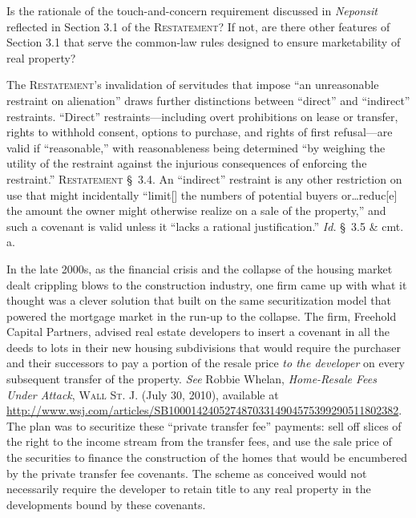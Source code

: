 
\item Is the rationale of the touch-and-concern requirement discussed in
\textit{Neponsit} reflected in Section 3.1 of the \textsc{Restatement}? If not,
are there
other features of Section 3.1 that serve the common-law rules designed to ensure
marketability of real property?

\item The \textsc{Restatement}'s invalidation of servitudes that impose ``an
unreasonable
restraint on alienation'' draws further distinctions between ``direct'' and
``indirect'' restraints. ``Direct'' restraints---including overt prohibitions on
lease or transfer, rights to withhold consent, options to purchase, and rights
of first refusal---are valid if ``reasonable,'' with reasonableness being
determined ``by weighing the utility of the restraint against the injurious
consequences of enforcing the restraint.'' \textsc{Restatement} \S~3.4. An
``indirect'' restraint is any other restriction on use that might incidentally
``limit[] the numbers of potential buyers or\ldots reduc[e] the amount the owner
might otherwise realize on a sale of the property,'' and such a covenant is
valid unless it ``lacks a rational justification.'' \textit{Id.} \S~3.5 \& cmt.
a.

\item In the late 2000s, as the financial crisis and the collapse of the housing
market dealt crippling blows to the construction industry, one firm came up with
what it thought was a clever solution that built on the same securitization
model that powered the mortgage market in the run-up to the collapse. The firm,
Freehold Capital Partners, advised real estate developers to insert a covenant
in all the deeds to lots in their new housing subdivisions that would require
the purchaser and their successors to pay a portion of the resale price
\textit{to the developer} on every subsequent transfer of the property.
\textit{See} Robbie Whelan, \textit{Home-Resale Fees Under Attack}, \textsc{Wall
St. J}. (July 30, 2010), available at
\url{http://www.wsj.com/articles/SB10001424052748703314904575399290511802382}.
The plan was to securitize these ``private transfer fee'' payments: sell off
slices of the right to the income stream from the transfer fees, and use the
sale price of the securities to finance the construction of the homes that would
be encumbered by the private transfer fee covenants. The scheme as conceived
would not necessarily require the developer to retain title to any real property
in the developments bound by these covenants.


